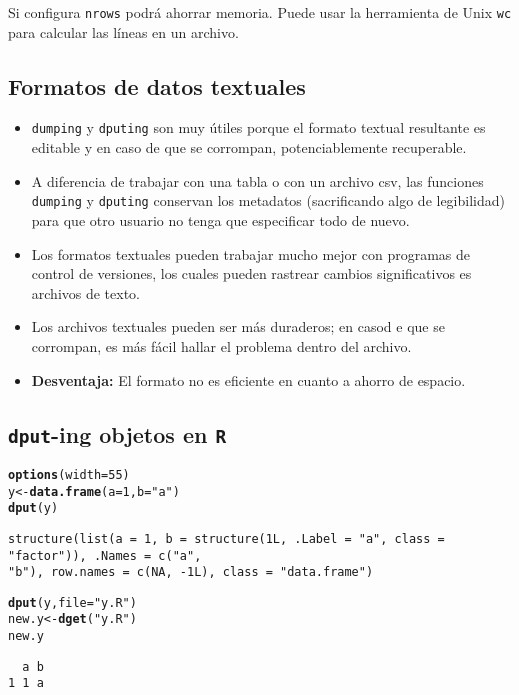 \documentclass{article}\usepackage[]{graphicx}\usepackage[]{color}
\makeatletter
\newcommand{\hlnum}[1]{\textcolor[rgb]{0.686,0.059,0.569}{#1}}%
\newcommand{\hlstr}[1]{\textcolor[rgb]{0.192,0.494,0.8}{#1}}%
\newcommand{\hlstd}[1]{\textcolor[rgb]{0.345,0.345,0.345}{#1}}%
\newcommand{\hlkwb}[1]{\textcolor[rgb]{0.69,0.353,0.396}{#1}}%
\newcommand{\hlkwc}[1]{\textcolor[rgb]{0.333,0.667,0.333}{#1}}%
\newcommand{\hlkwd}[1]{\textcolor[rgb]{0.737,0.353,0.396}{\textbf{#1}}}%
\newenvironment{kframe}{%
 \def\at@end@of@kframe{}%
 \ifinner\ifhmode%
  \def\at@end@of@kframe{\end{minipage}}%
  \begin{minipage}{\columnwidth}%
 \fi\fi%
 \def\FrameCommand##1{\hskip\@totalleftmargin \hskip-\fboxsep
 \colorbox{shadecolor}{##1}\hskip-\fboxsep
     \hskip-\linewidth \hskip-\@totalleftmargin \hskip\columnwidth}%
 \MakeFramed {\advance\hsize-\width
   \@totalleftmargin\z@ \linewidth\hsize
   \@setminipage}}%
 {\par\unskip\endMakeFramed%
 \at@end@of@kframe}
\newenvironment{knitrout}{}{} %
\makeatother
\begin{document}
  Si configura \texttt{nrows} podrá ahorrar memoria. Puede usar la herramienta de Unix \texttt{wc} para calcular las líneas en un archivo.
  
  \subsection{Formatos de datos textuales}
  \begin{itemize}
    \item \texttt{dumping} y \texttt{dputing} son muy útiles porque el formato textual resultante es editable y en caso de que se corrompan, potenciablemente recuperable.
    \item A diferencia de trabajar con una tabla o con un archivo csv, las funciones \texttt{dumping} y \texttt{dputing} conservan los metadatos (sacrificando algo de legibilidad) para que otro usuario no tenga que especificar todo de nuevo.  
    \item Los formatos textuales pueden trabajar mucho mejor con programas de control de versiones, los cuales pueden rastrear cambios significativos es archivos de texto.
    \item Los archivos textuales pueden ser más duraderos; en casod e que se corrompan, es más fácil hallar el problema dentro del archivo.
    \item \textbf{Desventaja:} El formato no es eficiente en cuanto a ahorro de espacio.
  \end{itemize}

  \subsection{\texttt{dput}-ing objetos en \texttt{R}}
\begin{knitrout}
\color{fgcolor}\begin{kframe}
\begin{alltt}
\hlkwd{options}\hlstd{(}\hlkwc{width} \hlstd{=} \hlnum{55}\hlstd{)}
\hlstd{y} \hlkwb{<-} \hlkwd{data.frame}\hlstd{(}\hlkwc{a} \hlstd{=} \hlnum{1}\hlstd{,} \hlkwc{b} \hlstd{=} \hlstr{"a"}\hlstd{)}
\hlkwd{dput}\hlstd{(y)}
\end{alltt}
\begin{verbatim}
structure(list(a = 1, b = structure(1L, .Label = "a", class = "factor")), .Names = c("a", 
"b"), row.names = c(NA, -1L), class = "data.frame")
\end{verbatim}
\begin{alltt}
\hlkwd{dput}\hlstd{(y,} \hlkwc{file}\hlstd{=}\hlstr{"y.R"}\hlstd{)}
\hlstd{new.y} \hlkwb{<-} \hlkwd{dget}\hlstd{(}\hlstr{"y.R"}\hlstd{)}
\hlstd{new.y}
\end{alltt}
\begin{verbatim}
  a b
1 1 a
\end{verbatim}
\end{kframe}
\end{knitrout}
\end{document}
